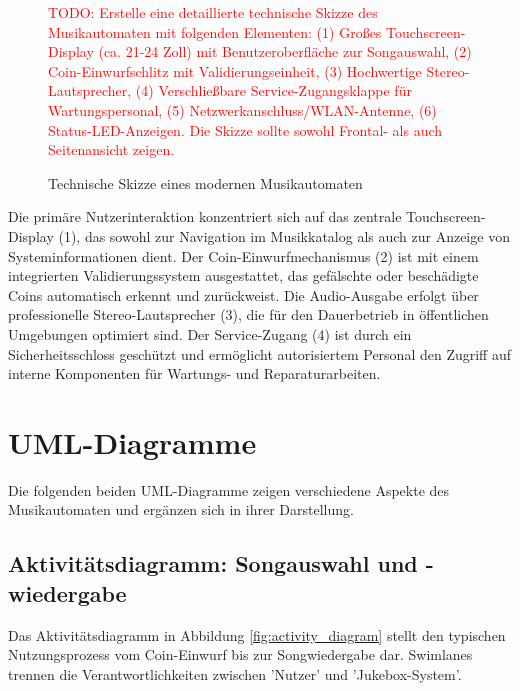 \documentclass[12pt,oneside]{article}
\newcommand{\todo}[1]{\textcolor{red}{TODO: #1}}
\begin{document}
\begin{figure}[H]
    \centering
    \todo{Erstelle eine detaillierte technische Skizze des Musikautomaten mit folgenden Elementen: (1) Großes Touchscreen-Display (ca. 21-24 Zoll) mit Benutzeroberfläche zur Songauswahl, (2) Coin-Einwurfschlitz mit Validierungseinheit, (3) Hochwertige Stereo-Lautsprecher, (4) Verschließbare Service-Zugangsklappe für Wartungspersonal, (5) Netzwerkanschluss/WLAN-Antenne, (6) Status-LED-Anzeigen. Die Skizze sollte sowohl Frontal- als auch Seitenansicht zeigen.}
    \caption{Technische Skizze eines modernen Musikautomaten}
    \label{fig:jukebox_skizze}
\end{figure}
\noindent
Die primäre Nutzerinteraktion konzentriert sich auf das zentrale Touchscreen-Display (1), das sowohl zur Navigation im Musikkatalog als auch zur Anzeige von Systeminformationen dient. Der Coin-Einwurfmechanismus (2) ist mit einem integrierten Validierungssystem ausgestattet, das gefälschte oder beschädigte Coins automatisch erkennt und zurückweist. Die Audio-Ausgabe erfolgt über professionelle Stereo-Lautsprecher (3), die für den Dauerbetrieb in öffentlichen Umgebungen optimiert sind. Der Service-Zugang (4) ist durch ein Sicherheitsschloss geschützt und ermöglicht autorisiertem Personal den Zugriff auf interne Komponenten für Wartungs- und Reparaturarbeiten.

\section{UML-Diagramme} \label{sec:uml_diagramme}
Die folgenden beiden UML-Diagramme zeigen verschiedene Aspekte des Musikautomaten und ergänzen sich in ihrer Darstellung.

\subsection{Aktivitätsdiagramm: Songauswahl und -wiedergabe}
Das Aktivitätsdiagramm in Abbildung \ref{fig:activity_diagram} stellt den typischen Nutzungsprozess vom Coin-Einwurf bis zur Songwiedergabe dar. Swimlanes trennen die Verantwortlichkeiten zwischen 'Nutzer' und 'Jukebox-System'.
\end{document}
